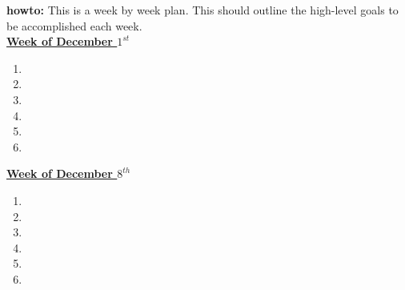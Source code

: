 \documentclass[11pt]{article}
\begin{document}
\newpage 
 \textbf{howto:} This is a week by week plan. This should outline the high-level goals to be accomplished each week.  \\


           {\small \underline{\textbf{Week of December $1^{st}$}}}\\
           \begin{enumerate}
             \small \item \small
           \item \small 
           \item \small
           \item \small 
           \item \small
           \item \small 
           \end{enumerate} 
           
           {\small \underline{\textbf{Week of December $8^{th}$}}}\\
           \begin{enumerate}
             \small \item \small
           \item \small 
           \item \small
           \item \small 
           \item \small
           \item \small 
           \end{enumerate}
           
\end{document}
